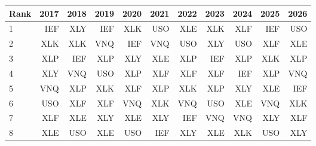 \begin{tabular}{lrrrrrrrrrr}
\toprule
Rank & 2017 & 2018 & 2019 & 2020 & 2021 & 2022 & 2023 & 2024 & 2025 & 2026 \\
\midrule
1 & IEF & XLY & IEF & XLK & USO & XLE & XLK & XLF & IEF & USO \\
2 & XLK & XLK & VNQ & IEF & VNQ & USO & XLY & USO & XLF & XLE \\
3 & XLP & IEF & XLP & XLY & XLE & XLP & IEF & XLP & XLK & XLP \\
4 & XLY & VNQ & USO & XLP & XLF & XLF & XLF & IEF & XLP & VNQ \\
5 & VNQ & XLP & XLK & XLF & XLP & XLK & XLP & XLY & XLE & IEF \\
6 & USO & XLF & XLF & VNQ & XLK & VNQ & USO & XLE & VNQ & XLK \\
7 & XLF & XLE & XLY & XLE & XLY & IEF & VNQ & VNQ & XLY & XLF \\
8 & XLE & USO & XLE & USO & IEF & XLY & XLE & XLK & USO & XLY \\
\bottomrule
\end{tabular}
